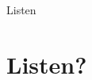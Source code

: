 



\begin{titleframe}
	\begin{center}
		\vspace{2cm}
		{\huge Listen}
	\end{center}
\end{titleframe}

\tocslide

\section{Listen?}
\begin{frame}
	\slidehead
\end{frame}

\begin{frame}
	\slidehead
\end{frame}


